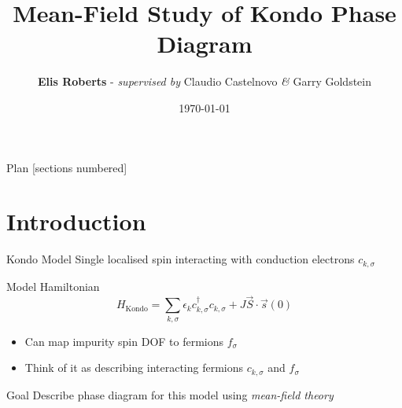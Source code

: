 \documentclass[13pt]{beamer}
\title{Mean-Field Study of Kondo Phase Diagram}
\date{\today}
\author{\textbf{Elis Roberts} - \textit{supervised by} Claudio Castelnovo \textit{\&} Garry Goldstein} %
\institute{University of Cambridge}
\begin{document}
  \maketitle

  \begin{frame}{Plan}
  [sections numbered]
  \tableofcontents[hideallsubsections]
  \end{frame}

  \section{Introduction}

  \begin{frame}{Kondo Model}
    Single localised spin interacting with conduction electrons $c^{}_{k,\sigma} $

    \vfill

    \begin{block}{Model Hamiltonian}
      $$ H_{\text{Kondo}}=\sum_{k,\sigma}\epsilon_{k} c_{k,\sigma}^{\dagger}c^{}_{k,\sigma}+J\vec{S}\cdot\vec{s}(0) $$
    \end{block}

    \begin{itemize}
    \item Can map impurity spin DOF to fermions $ f_{\sigma} $
    \item Think of it as describing interacting fermions $ c_{k,\sigma} $ and $ f_{\sigma} $

  \end{itemize}
    \vfill

    \begin{alertblock}{Goal}
      Describe phase diagram for this model using \emph{mean-field theory}
    \end{alertblock}

  \end{frame}
\end{document}
